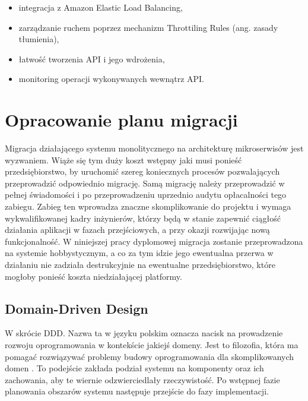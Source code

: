 \documentclass[12pt,twoside]{book}
\begin{document}
    \begin{itemize}
        \item integracja z Amazon Elastic Load Balancing,
        \item zarządzanie ruchem poprzez mechanizm Throttiling Rules (ang. zasady tłumienia),
        \item łatwość tworzenia API i jego wdrożenia,
        \item monitoring operacji wykonywanych wewnątrz API. \cite{aws.api.gateway}
    \end{itemize}


    \section{Opracowanie planu migracji}
    Migracja działającego systemu monolitycznego na architekturę mikroserwisów jest wyzwaniem. Wiąże się tym duży koszt wstępny jaki musi ponieść przedsiębiorstwo, by uruchomić szereg koniecznych procesów pozwalających przeprowadzić odpowiednio migrację. Samą migrację należy przeprowadzić w pełnej świadomości i po przeprowadzeniu uprzednio audytu opłacalności tego zabiegu. Zabieg ten wprowadza znaczne skomplikowanie do projektu i wymaga wykwalifikowanej kadry inżynierów, którzy będą w stanie zapewnić ciągłość działania aplikacji w fazach przejściowych, a przy okazji rozwijając nową funkcjonalność.
    W niniejszej pracy dyplomowej migracja zostanie przeprowadzona na systemie hobbystycznym, a co za tym idzie jego ewentualna przerwa w działaniu nie zadziała destrukcyjnie na ewentualne przedsiębiorstwo, które mogłoby ponieść koszta niedziałającej platformy.

    \subsection{Domain-Driven Design}
    W skrócie DDD. Nazwa ta w języku polskim oznacza nacisk na prowadzenie rozwoju oprogramowania w kontekście jakiejś domeny. Jest to filozofia, która ma pomagać rozwiązywać problemy budowy oprogramowania dla skomplikowanych domen \cite{patterns.principles.and.practices.of.ddd}.
    To podejście zakłada podział systemu na komponenty oraz ich zachowania, aby te wiernie odzwierciedlały rzeczywistość. Po wstępnej fazie planowania obszarów systemu następuje przejście do fazy implementacji.
\end{document}
